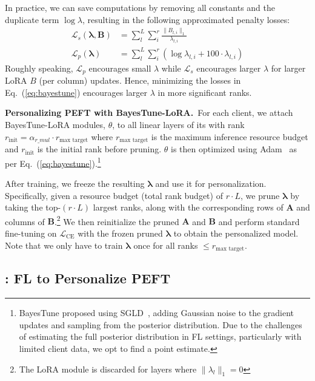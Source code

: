 In practice, we can save computations by removing all constants and the duplicate term $\log \lambda$, resulting in the following approximated penalty losses:
\begin{align}
\mathcal{L}_s(\bm{\lambda}, \bm{B}) &= \sum^L_l \sum^r_i \frac{\|B_{l,i}\|_1}{\lambda_{l,i}} \\
\mathcal{L}_p(\bm{\lambda}) &= \sum^L_l \sum^r_i (\log \lambda_{l,i} + 100 \cdot \lambda_{l,i}) 
\end{align}
Roughly speaking, $\mathcal{L}_p$ encourages small $\lambda$ while $\mathcal{L}_s$ encourages larger $\lambda$ for larger LoRA $B$ (per column) updates. Hence, minimizing the losses in Eq.~(\ref{eq:bayestune}) encourages larger $\lambda$ in more significant ranks. 

\noindent\textbf{Personalizing PEFT with BayesTune-LoRA.}~For each client, we attach BayesTune-LoRA modules, $\theta$, to all linear layers of its \basemodel{} with rank $r_{\text{init}} = \alpha_{r\_mul} \cdot r_{\text{max target}}$ where $r_{\text{max target}}$ is the maximum inference resource budget and $r_{\text{init}}$ is the initial rank before pruning. $\theta$ is then optimized using Adam~\cite{Kingma_2014} as per Eq.~(\ref{eq:bayestune}).\footnote{BayesTune proposed using SGLD~\cite{welling2011bayesian}, adding Gaussian noise to the gradient updates and sampling from the posterior distribution. Due to the challenges of estimating the full posterior distribution in FL settings, particularly with limited client data, we opt to find a point estimate.}

After training, we freeze the resulting $\bm{\lambda}$ and use it for personalization. Specifically, given a resource budget (total rank budget) of $r \cdot L$, we prune $\bm{\lambda}$ by taking the top-$(r \cdot L)$ largest ranks, along with the corresponding rows of $\bm{A}$ and columns of $\bm{B}$.\footnote{The LoRA module is discarded for layers where $\|\lambda_l\|_1 = 0$} We then reinitialize the pruned $\bm{A}$ and $\bm{B}$ and perform standard fine-tuning on $\mathcal{L}_{\text{CE}}$ with the frozen pruned $\bm{\lambda}$ to obtain the personalized model. Note that we only have to train $\bm{\lambda}$ once for all ranks $\leq r_{\text{max target}}$.

\subsection{\method{}: FL to Personalize PEFT}\label{sec:main_method}

